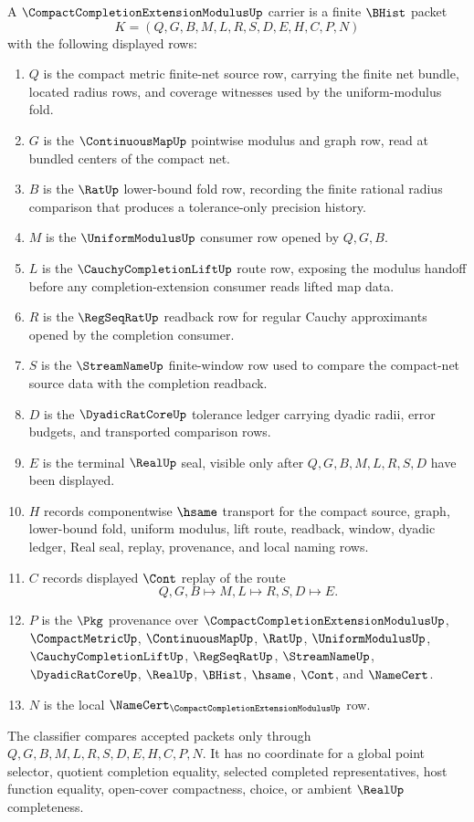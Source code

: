 \begin{definition}
\label{def:compact-completion-extension-modulus-carrier}
A $\CompactCompletionExtensionModulusUp$ carrier is a finite $\BHist$ packet
$$
K=(Q,G,B,M,L,R,S,D,E,H,C,P,N)
$$
with the following displayed rows:
\begin{enumerate}
\item $Q$ is the compact metric finite-net source row, carrying the finite net bundle, located radius rows, and coverage witnesses used by the uniform-modulus fold.
\item $G$ is the $\ContinuousMapUp$ pointwise modulus and graph row, read at bundled centers of the compact net.
\item $B$ is the $\RatUp$ lower-bound fold row, recording the finite rational radius comparison that produces a tolerance-only precision history.
\item $M$ is the $\UniformModulusUp$ consumer row opened by $Q,G,B$.
\item $L$ is the $\CauchyCompletionLiftUp$ route row, exposing the modulus handoff before any completion-extension consumer reads lifted map data.
\item $R$ is the $\RegSeqRatUp$ readback row for regular Cauchy approximants opened by the completion consumer.
\item $S$ is the $\StreamNameUp$ finite-window row used to compare the compact-net source data with the completion readback.
\item $D$ is the $\DyadicRatCoreUp$ tolerance ledger carrying dyadic radii, error budgets, and transported comparison rows.
\item $E$ is the terminal $\RealUp$ seal, visible only after $Q,G,B,M,L,R,S,D$ have been displayed.
\item $H$ records componentwise $\hsame$ transport for the compact source, graph, lower-bound fold, uniform modulus, lift route, readback, window, dyadic ledger, Real seal, replay, provenance, and local naming rows.
\item $C$ records displayed $\Cont$ replay of the route
$$
Q,G,B \longmapsto M,L \longmapsto R,S,D \longmapsto E .
$$
\item $P$ is the $\Pkg$ provenance over $\CompactCompletionExtensionModulusUp$, $\CompactMetricUp$, $\ContinuousMapUp$, $\RatUp$, $\UniformModulusUp$, $\CauchyCompletionLiftUp$, $\RegSeqRatUp$, $\StreamNameUp$, $\DyadicRatCoreUp$, $\RealUp$, $\BHist$, $\hsame$, $\Cont$, and $\NameCert$.
\item $N$ is the local $\NameCert_{\CompactCompletionExtensionModulusUp}$ row.
\end{enumerate}
The classifier compares accepted packets only through $Q,G,B,M,L,R,S,D,E,H,C,P,N$. It has no coordinate for a global point selector, quotient completion equality, selected completed representatives, host function equality, open-cover compactness, choice, or ambient $\RealUp$ completeness.
\end{definition}

